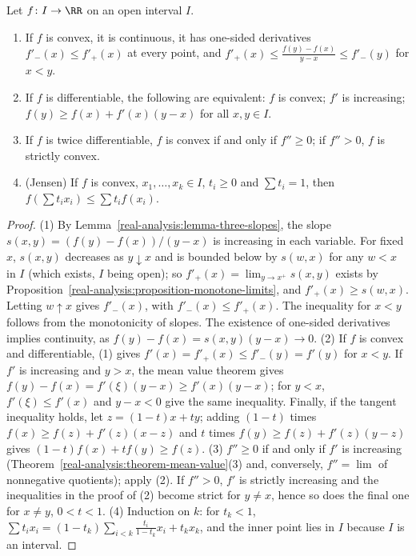\begin{proposition}\label{real-analysis:proposition-convex}
Let $f \colon I \to \RR$ on an open interval $I$.
\begin{enumerate}
\item If $f$ is convex, it is continuous, it has one-sided derivatives $f'_-(x) \leq f'_+(x)$ at every point, and $f'_+(x) \leq \frac{f(y) - f(x)}{y - x} \leq f'_-(y)$ for $x < y$.
\item If $f$ is differentiable, the following are equivalent: $f$ is convex; $f'$ is increasing; $f(y) \geq f(x) + f'(x)(y - x)$ for all $x, y \in I$.
\item If $f$ is twice differentiable, $f$ is convex if and only if $f'' \geq 0$; if $f'' > 0$, $f$ is strictly convex.
\item (Jensen) If $f$ is convex, $x_1, \ldots, x_k \in I$, $t_i \geq 0$ and $\sum t_i = 1$, then $f(\sum t_ix_i) \leq \sum t_if(x_i)$.
\end{enumerate}
\end{proposition}

\begin{proof}
(1) By Lemma~\ref{real-analysis:lemma-three-slopes}, the slope $s(x, y) = (f(y) - f(x))/(y - x)$ is increasing in each variable. For fixed $x$, $s(x, y)$ decreases as $y \downarrow x$ and is bounded below by $s(w, x)$ for any
$w < x$ in $I$ (which exists, $I$ being open); so $f'_+(x) = \lim_{y \to x^+}s(x, y)$ exists by Proposition~\ref{real-analysis:proposition-monotone-limits}, and $f'_+(x) \geq s(w, x)$. Letting $w \uparrow x$ gives $f'_-(x)$, with
$f'_-(x) \leq f'_+(x)$. The inequality for $x < y$ follows from the monotonicity of slopes. The existence of one-sided derivatives implies continuity, as $f(y) - f(x) = s(x, y)(y - x) \to 0$.
(2) If $f$ is convex and differentiable, (1) gives $f'(x) = f'_+(x) \leq f'_-(y) = f'(y)$ for $x < y$. If $f'$ is increasing and $y > x$, the mean value theorem gives $f(y) - f(x) = f'(\xi)(y - x) \geq f'(x)(y - x)$; for $y < x$,
$f'(\xi) \leq f'(x)$ and $y - x < 0$ give the same inequality. Finally, if the tangent inequality holds, let $z = (1 - t)x + ty$; adding $(1 - t)$ times $f(x) \geq f(z) + f'(z)(x - z)$ and $t$ times $f(y) \geq f(z) + f'(z)(y - z)$ gives
$(1 - t)f(x) + tf(y) \geq f(z)$.
(3) $f'' \geq 0$ if and only if $f'$ is increasing (Theorem~\ref{real-analysis:theorem-mean-value}(3) and, conversely, $f'' = \lim$ of nonnegative quotients); apply (2). If $f'' > 0$, $f'$ is strictly increasing and the
inequalities in the proof of (2) become strict for $y \neq x$, hence so does the final one for $x \neq y$, $0 < t < 1$.
(4) Induction on $k$: for $t_k < 1$, $\sum t_ix_i = (1 - t_k)\sum_{i<k}\frac{t_i}{1 - t_k}x_i + t_kx_k$, and the inner point lies in $I$ because $I$ is an interval.
\end{proof}

